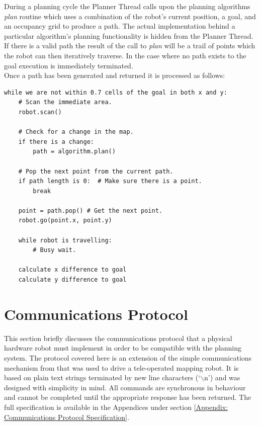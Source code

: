 \noindent
During a planning cycle the Planner Thread calls upon the planning algorithms \textit{plan} routine which uses a combination of the robot's current position, a goal, and an occupancy grid to produce a path. The actual implementation behind a particular algorithm's planning functionality is hidden from the Planner Thread. If there is a valid path the result of the call to \textit{plan} will be a trail of points which the robot can then iteratively traverse. In the case where no path exists to the goal execution is immediately terminated. \\

\noindent
Once a path has been generated and returned it is processed as follows: \\

\begin{lstlisting}
while we are not within 0.7 cells of the goal in both x and y:
	# Scan the immediate area.
	robot.scan()
	
	# Check for a change in the map.
	if there is a change:
		path = algorithm.plan()
		
	# Pop the next point from the current path.
	if path length is 0:  # Make sure there is a point.
		break

	point = path.pop() # Get the next point.
	robot.go(point.x, point.y)
	
	while robot is travelling:
		# Busy wait.

	calculate x difference to goal
	calculate y difference to goal
\end{lstlisting}


\section{Communications Protocol}\label{sec:protocol}
\noindent
This section briefly discusses the communications protocol that a physical hardware robot must implement in order to be compatible with the planning system. The protocol covered here is an extension of the simple communications mechanism from \cite{JMD14} that was used to drive a tele-operated mapping robot. It is based on plain text strings terminated by new line characters (`$\backslash$n') and was designed with simplicity in mind. All commands are synchronous in behaviour and cannot be completed until the appropriate response has been returned. The full specification is available in the Appendices under section \ref{Appendix: Communications Protocol Specification}.

